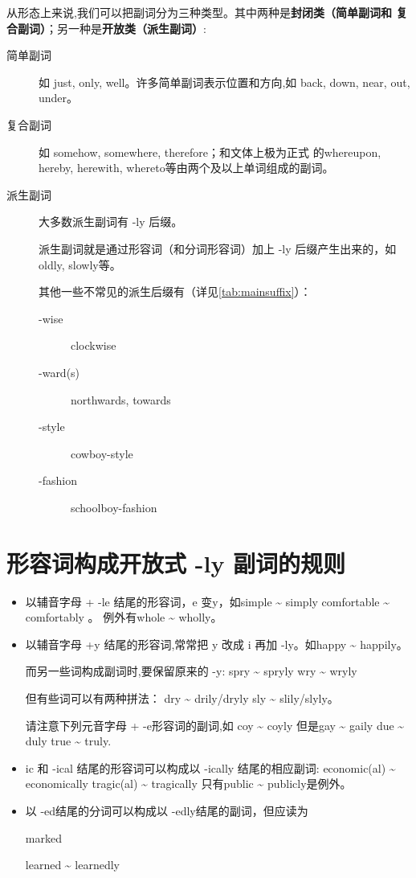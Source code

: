 从形态上来说,我们可以把副词分为三种类型。其中两种是\textbf{封闭类（简单副词和
  复合副词）}；另一种是\textbf{开放类（派生副词）}:
\begin{description}
\item[简单副词] 如 just, only, well。许多简单副词表示位置和方向,如 back, down,
  near, out, under。

\item[复合副词] 如 somehow, somewhere, therefore；和文体上极为正式
  的whereupon, hereby, herewith, whereto等由两个及以上单词组成的副词。

\item[派生副词] 大多数派生副词有 -ly 后缀。

  派生副词就是通过形容词（和分词形容词）加上 -ly 后缀产生出来的，如oldly,
  slowly等。

  其他一些不常见的派生后缀有（详见\cref{tab:mainsuffix}）：
  \begin{description}
  \item[-wise] clockwise
  \item[-ward(s)] northwards, towards
  \item[-style] cowboy-style
  \item[-fashion] schoolboy-fashion
  \end{description}

\end{description}

\section{形容词构成开放式 -ly 副词的规则}
\begin{itemize}
\item 以辅音字母 + -le 结尾的形容词，e 变y，如simple \~{} simply \qquad comfortable
  \~{} comfortably 。 例外有whole \~{} wholly。

\item 以辅音字母 +y 结尾的形容词,常常把 y 改成 i 再加 -ly。如happy \~{} happily。

  而另一些词构成副词时,要保留原来的 -y: spry \~{} spryly \qquad wry \~{} wryly

  但有些词可以有两种拼法： dry \~{} drily/dryly \qquad sly \~{} slily/slyly。

  请注意下列元音字母 + -e形容词的副词,如 coy \~{} coyly 但是gay \~{} gaily
  \qquad due \~{} duly \qquad true \~{} truly.

\item ic 和 -ical 结尾的形容词可以构成以 -ically 结尾的相应副词:
  economic(al) \~{} economically \qquad tragic(al) \~{} tragically
  只有public \~{} publicly是例外。

\item 以 -ed结尾的分词可以构成以 -edly结尾的副词，但应读为

  marked  \qquad {}

  learned  \~{} learnedly 
\end{itemize}


